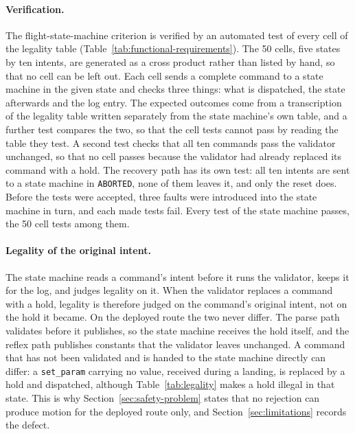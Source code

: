 \paragraph{Verification.} The flight-state-machine criterion is verified by an automated test of
every cell of the legality table (Table~\ref{tab:functional-requirements}). The 50 cells, five
states by ten intents, are generated as a cross product rather than listed by hand, so that no cell
can be left out. Each cell sends a complete command to a state machine in the given state and checks
three things: what is dispatched, the state afterwards and the log entry. The expected outcomes come
from a transcription of the legality table written separately from the state machine's own table,
and a further test compares the two, so that the cell tests cannot pass by reading the table they
test. A second test checks that all ten commands pass the validator unchanged, so that no cell
passes because the validator had already replaced its command with a hold. The recovery path has
its own test: all ten intents are sent to a state machine in \texttt{ABORTED}, none of them leaves
it, and only the reset does. Before the tests were accepted, three faults were introduced into the
state machine in turn, and each made tests fail. Every test of the state machine passes, the 50
cell tests among them.

\paragraph{Legality of the original intent.} The state machine reads a command's intent before it
runs the validator, keeps it for the log, and judges legality on it. When the validator replaces a
command with a hold, legality is therefore judged on the command's original intent, not on the hold
it became. On the deployed route the two never differ. The parse path validates before it publishes,
so the state machine receives the hold itself, and the reflex path publishes constants that the
validator leaves unchanged. A command that has not been validated and is handed to the state machine
directly can differ: a \texttt{set\_param} carrying no value, received during a landing, is replaced
by a hold and dispatched, although Table~\ref{tab:legality} makes a hold illegal in that state. This
is why Section~\ref{sec:safety-problem} states that no rejection can produce motion for the
deployed route only, and Section~\ref{sec:limitations} records the defect.

